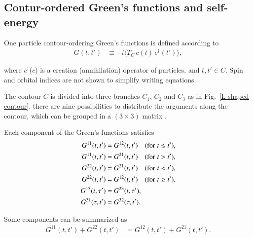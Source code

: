 	
\FloatBarrier
\subsection{Contur-ordered Green's functions and self-energy}
	
One particle contour-ordering Green's functions is defined according to
\begin{align}
G(t,t')
&\equiv
-i\langle T_{C}\, c(t)\, c^\dagger(t')\rangle,
\label{green def}
\end{align}

where $c^{\dagger}$($c$) is a creation (annihilation) operator of particles, and $t,t' \in C$. Spin and orbital indices are not shown to simplify writing equations.

The contour $C$ is divided into three branches $C_1$, $C_2$ and $C_3$ as in Fig.~\ref{L-shaped contour}. there are nine possibilities to distribute the arguments along the contour, which can be grouped in a $(3 \times 3)$ matrix \citep{PhysRevB.44.6104}. 

Each component of the Green's functions satisfies
\begin{subequations}
\begin{align}
 \label{redundancy-1}
 G^{11}(t,t')
  &=
   G^{12}(t,t') \quad ({\rm for}\; t\le t'),
 \\
 G^{11}(t,t')
  &=
   G^{21}(t,t') \quad ({\rm for}\; t>t'),
 \\
 G^{22}(t,t')
  &=
   G^{21}(t,t') \quad ({\rm for}\; t<t'),
 \\
 \label{redundancy-4}
 G^{22}(t,t')
  &=
   G^{12}(t,t') \quad ({\rm for}\; t\ge t'),
 \\
 G^{13}(t,\tau ')
  &=
   G^{23}(t,\tau '),
 \\
 G^{31}(\tau,t')
  &=
   G^{32}(\tau,t').
\end{align}
\label{redundancy}
\end{subequations}


Some components can be summarized as
\begin{align}
G^{11}(t,t')+G^{22}(t,t')
 &=
  G^{12}(t,t')+G^{21}(t,t'). 
\label{linear dependence1}
\end{align}

